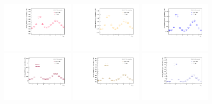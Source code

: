 \begin{figure}[ht]
    \centering
    \includegraphics[width=0.32\textwidth]{figures/analysis/h_lambda_dphi_subtracted_0_20_singletrigger.pdf}
    \includegraphics[width=0.32\textwidth]{figures/analysis/h_lambda_dphi_subtracted_20_50_singletrigger.pdf}
    \includegraphics[width=0.32\textwidth]{figures/analysis/h_lambda_dphi_subtracted_50_80_singletrigger.pdf}
    \includegraphics[width=0.32\textwidth]{figures/analysis/h_h_dphi_0_20_singletrigger.pdf}
    \includegraphics[width=0.32\textwidth]{figures/analysis/h_h_dphi_20_50_singletrigger.pdf}
    \includegraphics[width=0.32\textwidth]{figures/analysis/h_h_dphi_50_80_singletrigger.pdf}

\end{figure}
